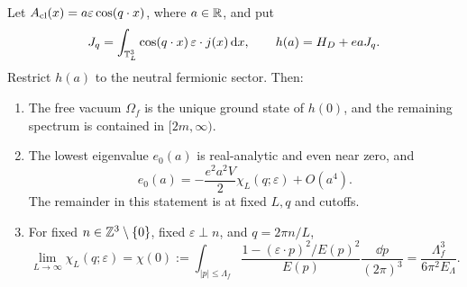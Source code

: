 \begin{proposition}
\label{prop:response}
Let \(A_{\rm cl}(x)=a\varepsilon\cos(q\cdot x)\), where \(a\in\mathbb R\), and put
\[
 J_q=\int_{\mathbb T_L^3}\cos(q\cdot x)\,\varepsilon\cdot j(x)\,\mathrm d x,
 \qquad h(a)=H_D+eaJ_q.
\]
Restrict \(h(a)\) to the neutral fermionic sector. Then:
\begin{enumerate}[label=(\roman*)]
\item The free vacuum \(\Omega_f\) is the unique ground state of \(h(0)\),
and the remaining spectrum is contained in \([2m,\infty)\).
\item The lowest eigenvalue \(e_0(a)\) is real-analytic and even near zero,
and
\begin{equation}
 e_0(a)=-\frac{e^2a^2V}{2}\chi_L(q;\varepsilon)+O(a^4).
 \label{eq:second-order}
\end{equation}
The remainder in this statement is at fixed \(L,q\) and cutoffs.
\item For fixed \(n\in\mathbb Z^3\setminus\{0\}\), fixed \(\varepsilon\perp n\),
and \(q=2\pi n/L\),
\begin{equation}
 \lim_{L\to\infty}\chi_L(q;\varepsilon)=\chi(0)
 :=\int_{|p|\leq\Lambda_f}
 \frac{1-(\varepsilon\cdot p)^2/E(p)^2}{E(p)}\frac{\dd p}{(2\pi)^3}
 =\frac{\Lambda_f^3}{6\pi^2E_\Lambda}.
 \label{eq:chi0}
\end{equation}
\end{enumerate}
\end{proposition}
